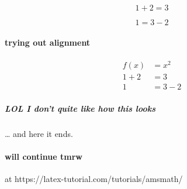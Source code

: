 \documentclass[a4paper, 12pt]{article}
\begin{document}
\begin{equation*}
  1 + 2 = 3 
\end{equation*}

\begin{equation*}
  1 = 3 - 2
\end{equation*}

\paragraph{trying out alignment}
\begin{align*}
    f(x) &= x^2\\
    1 + 2 &= 3\\
  1 &= 3 - 2
\end{align*}
\subparagraph{LOL I don't quite like how this looks}

\ldots{} and here it ends.

\paragraph{will continue tmrw} at https://latex-tutorial.com/tutorials/amsmath/
\end{document}
